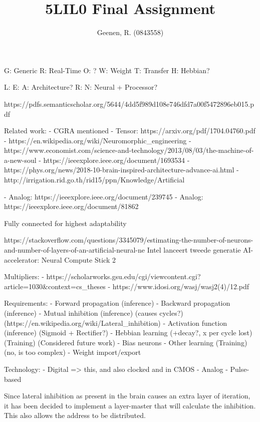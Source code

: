 \documentclass[twocolumn]{article}
\title{5LIL0 Final Assignment}
\author{Geenen, R. (0843558)}
\begin{document}
\maketitle

G: Generic
R: Real-Time
O: ?
W: Weight
T: Transfer
H: Hebbian?

L:
E:
A: Architecture?
R:
N: Neural
+ Processor?

https://pdfs.semanticscholar.org/5644/4dd5f989d108e746dfd7a00f5472896eb015.pdf

Related work:
 - CGRA mentioned
 - Tensor: https://arxiv.org/pdf/1704.04760.pdf
 - https://en.wikipedia.org/wiki/Neuromorphic_engineering
 - https://www.economist.com/science-and-technology/2013/08/03/the-machine-of-a-new-soul
 - https://ieeexplore.ieee.org/document/1693534
 - https://phys.org/news/2018-10-brain-inspired-architecture-advance-ai.html
 - http://irrigation.rid.go.th/rid15/ppn/Knowledge/Artificial%

 - Analog: https://ieeexplore.ieee.org/document/239745
 - Analog: https://ieeexplore.ieee.org/document/81862

Fully connected for highest adaptability

 
https://stackoverflow.com/questions/3345079/estimating-the-number-of-neurons-and-number-of-layers-of-an-artificial-neural-ne
Intel lanceert tweede generatie AI-accelerator: Neural Compute Stick 2
 
 
Multipliers:
 - https://scholarworks.gsu.edu/cgi/viewcontent.cgi?article=1030&context=cs_theses
 - https://www.idosi.org/wasj/wasj2(4)/12.pdf
 
 
 
Requirements:
 - Forward propagation (inference)
 - Backward propagation (inference)
 - Mutual inhibition (inference) (causes cycles?) (https://en.wikipedia.org/wiki/Lateral_inhibition)
 - Activation function (inference) (Sigmoid + Rectifier?)
 - Hebbian learning (+decay?, x per cycle lost) (Training) (Considered future work)
 - Bias neurons
 - Other learning (Training) (no, is too complex)
 - Weight import/export
 
Technology:
 - Digital => this, and also clocked and in CMOS
 - Analog
 - Pulse-based


Since lateral inhibition as present in the brain causes an extra layer of iteration, it has been decided to implement a layer-master that will calculate the inhibition. This also allows the address to be distributed.
\end{document}
